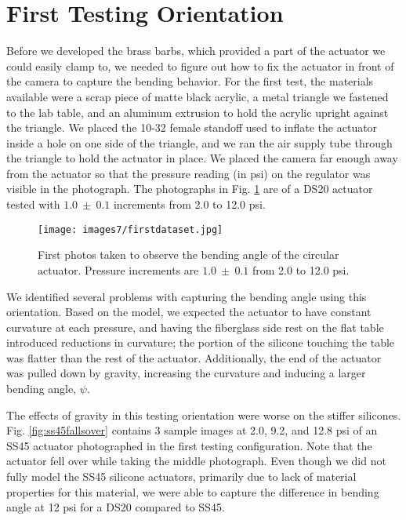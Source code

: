\section{First Testing Orientation}

Before we developed the brass barbs, which provided a part of the actuator we could easily clamp to, we needed to figure out how to fix the actuator in front of the camera to capture the bending behavior. For the first test, the materials available were a scrap piece of matte black acrylic, a metal triangle we fastened to the lab table, and an aluminum extrusion to hold the acrylic upright against the triangle. We placed the 10-32 female standoff used to inflate the actuator inside a hole on one side of the triangle, and we ran the air supply tube through the triangle to hold the actuator in place. We placed the camera far enough away from the actuator so that the pressure reading (in psi) on the regulator was visible in the photograph. The photographs in Fig. \ref{fig:firstdataset} are of a DS20 actuator tested with $1.0~\pm~0.1$ increments from 2.0 to 12.0 psi. 

\begin{figure}[!ht]
    \centering
     \texttt{[image: images7/firstdataset.jpg]}
    \caption{First photos taken to observe the bending angle of the circular actuator. Pressure increments are $1.0~\pm~0.1$ from 2.0 to 12.0 psi.}
    \label{fig:firstdataset}
\end{figure}

\clearpage
We identified several problems with capturing the bending angle using this orientation. Based on the model, we expected the actuator to have constant curvature at each pressure, and having the fiberglass side rest on the flat table introduced reductions in curvature; the portion of the silicone touching the table was flatter than the rest of the actuator. Additionally, the end of the actuator was pulled down by gravity, increasing the curvature and inducing a larger bending angle, $\psi$. 

The effects of gravity in this testing orientation were worse on the stiffer silicones. Fig. \ref{fig:ss45fallsover} contains 3 sample images at 2.0, 9.2, and 12.8 psi of an SS45 actuator photographed in the first testing configuration. Note that the actuator fell over while taking the middle photograph. Even though we did not fully model the SS45 silicone actuators, primarily due to lack of material properties for this material, we were able to capture the difference in bending angle at 12 psi for a DS20 compared to SS45. 

